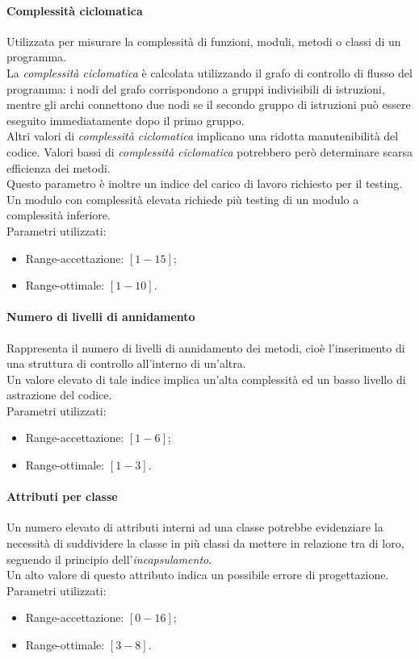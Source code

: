 \paragraph{Complessità ciclomatica}
Utilizzata per misurare la complessità di funzioni, moduli, metodi o classi di un programma.\\
La \textit{complessità ciclomatica} è calcolata utilizzando il grafo di controllo di flusso del programma: i nodi del grafo corrispondono a gruppi indivisibili di istruzioni, mentre gli archi connettono due nodi se il secondo gruppo di istruzioni può essere eseguito immediatamente dopo il primo gruppo.\\
Altri valori di  \textit{complessità ciclomatica} implicano una ridotta manutenibilità del codice. Valori bassi di  \textit{complessità ciclomatica} potrebbero però determinare scarsa efficienza dei metodi.\\
Questo parametro è inoltre un indice del carico di lavoro richiesto per il testing. Un modulo con complessità elevata richiede più testing di un modulo a complessità inferiore.\\
Parametri utilizzati:
\begin{itemize}
\item Range-accettazione: $[1-15]$;
\item Range-ottimale: $[1-10]$.
\end{itemize}

\paragraph{Numero di livelli di annidamento}
Rappresenta il numero di livelli di annidamento dei metodi, cioè l'inserimento di una struttura di controllo all'interno di un'altra.\\
Un valore elevato di tale indice implica un'alta complessità ed un basso livello di astrazione del codice.\\
Parametri utilizzati:
\begin{itemize}
\item Range-accettazione: $[1-6]$;
\item Range-ottimale: $[1-3]$.
\end{itemize}

\paragraph{Attributi per classe}
Un numero elevato di attributi interni ad una classe potrebbe evidenziare la necessità di suddividere la classe in più classi da mettere in relazione tra di loro, seguendo il principio dell'\textit{incapsulamento}.\\
Un alto valore di questo attributo indica un possibile errore di progettazione.\\
Parametri utilizzati:
\begin{itemize}
\item Range-accettazione: $[0-16]$;
\item Range-ottimale: $[3-8]$.
\end{itemize}

